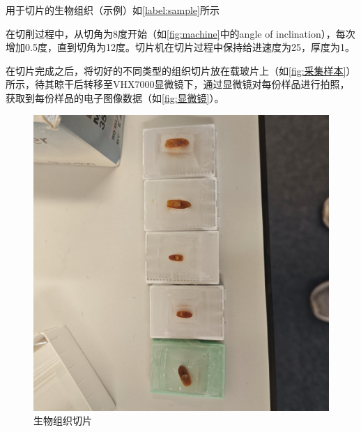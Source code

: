用于切片的生物组织（示例）如\autoref{label:sample}所示

在切削过程中，从切角为8度开始（如\autoref{fig:machine}中的angle of inclination），每次增加0.5度，直到切角为12度。切片机在切片过程中保持给进速度为25，厚度为1。

在切片完成之后，将切好的不同类型的组织切片放在载玻片上（如\autoref{fig:采集样本}）所示，待其晾干后转移至VHX7000显微镜下，通过显微镜对每份样品进行拍照，获取到每份样品的电子图像数据（如\autoref{fig:显微镜}）。

\begin{figure}[htbp]
    \centering
    \begin{minipage}{0.3\textwidth}
        \centering
        \includegraphics[width=\textwidth]{./fig/sample.jpg}
        \caption{生物组织切片}
        \label{label:sample}
    \end{minipage}
    \begin{minipage}{0.3\textwidth}
        \centering

\end{minipage}
\end{figure}
